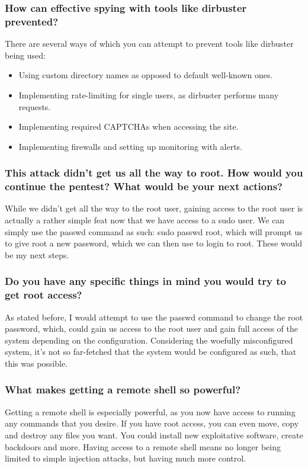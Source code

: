 \subsubsection{How can effective spying with tools like dirbuster prevented?}
There are several ways of which you can attempt to prevent tools like dirbuster being used:

\begin{itemize}
  \item Using custom directory names as opposed to default well-known ones.
  \item Implementing rate-limiting for single users, as dirbuster performs many requests.
  \item Implementing required CAPTCHAs when accessing the site.
  \item Implementing firewalls and setting up monitoring with alerts.
\end{itemize}

\subsubsection{This attack didn't get us all the way to root. How would you continue the pentest? What would be your next actions?}
While we didn't get all the way to the root user, gaining access to the root user is actually a rather simple feat now that we have access to a sudo user. We can simply use the passwd command as such: sudo passwd root, which will prompt us to give root a new password, which we can then use to login to root. These would be my next steps.

\subsubsection{Do you have any specific things in mind you would try to get root access?}
As stated before, I would attempt to use the passwd command to change the root password, which, could gain us access to the root user and gain full access of the system depending on the configuration. Considering the woefully misconfigured system, it's not so far-fetched that the system would be configured as such, that this was possible.

\subsubsection{What makes getting a remote shell so powerful?}
Getting a remote shell is especially powerful, as you now have access to running any commands that you desire. If you have root access, you can even move, copy and destroy any files you want. You could install new exploitative software, create backdoors and more. Having access to a remote shell means no longer being limited to simple injection attacks, but having much more control.